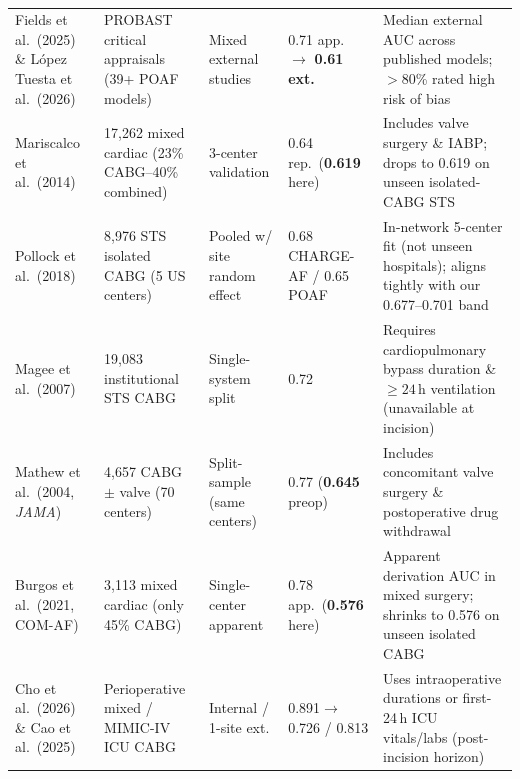 \begin{table}[t]
\centering\tablefont
\caption{}
\label{tab:lit_reconciliation}
\setlength{\tabcolsep}{3.6pt}
\renewcommand{\arraystretch}{1.04}
\begin{tabularx}{\textwidth}{@{}L{3.25cm}L{3.25cm}L{2.25cm}L{2.35cm}Y@{}}
\toprule
{} &  &  &  &  \\
\midrule
Fields et al.\ (2025)\cite{fields2025poaf} \& L\'opez Tuesta et al.\ (2026)\cite{lopeztuesta2026poaf} & PROBAST critical appraisals (39+ POAF models) & Mixed external studies & 0.71 app.\ $\to$ \textbf{0.61 ext.} & Median external AUC across published models; $>$80\% rated high risk of bias \\
Mariscalco et al.\ (2014)\cite{mariscalco2014poaf} & 17,262 mixed cardiac (23\% CABG--40\% combined) & 3-center validation & 0.64 rep.\ (\textbf{0.619} here) & Includes valve surgery \& IABP; drops to 0.619 on unseen isolated-CABG STS \\
Pollock et al.\ (2018)\cite{pollock2018chargeaf} & 8,976 STS isolated CABG (5 US centers) & Pooled w/ site random effect & 0.68 CHARGE-AF / 0.65 POAF & In-network 5-center fit (not unseen hospitals); aligns tightly with our 0.677--0.701 band \\
Magee et al.\ (2007)\cite{magee2007atrial} & 19,083 institutional STS CABG & Single-system split & 0.72 & Requires cardiopulmonary bypass duration \& $\ge 24$\,h ventilation (unavailable at incision) \\
Mathew et al.\ (2004, \textit{JAMA})\cite{mathew2004multicenter} & 4,657 CABG $\pm$ valve (70 centers) & Split-sample (same centers) & 0.77 (\textbf{0.645} preop) & Includes concomitant valve surgery \& postoperative drug withdrawal \\
Burgos et al.\ (2021, COM-AF)\cite{burgos2021comaf} & 3,113 mixed cardiac (only 45\% CABG) & Single-center apparent & 0.78 app.\ (\textbf{0.576} here) & Apparent derivation AUC in mixed surgery; shrinks to 0.576 on unseen isolated CABG \\
Cho et al.\ (2026)\cite{cho2026poaf} \& Cao et al.\ (2025)\cite{cao2025mimic4} & Perioperative mixed / MIMIC-IV ICU CABG & Internal / 1-site ext. & 0.891$\to$0.726 / 0.813 & Uses intraoperative durations or first-24\,h ICU vitals/labs (post-incision horizon) \\

\end{tabularx}
\end{table}
